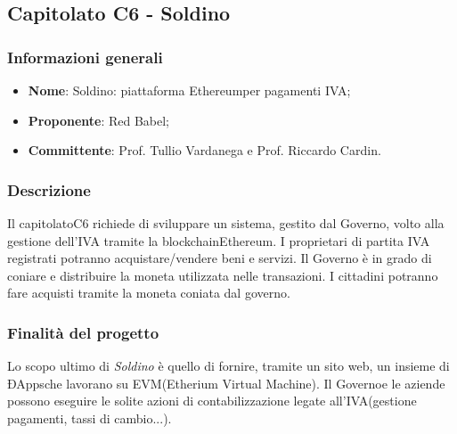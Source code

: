 \subsection{Capitolato C6 - Soldino}

\subsubsection{Informazioni generali}
\begin{itemize}
	\item \textbf {Nome}: Soldino: piattaforma Ethereum\glosp per pagamenti IVA;
	\item \textbf {Proponente}: Red Babel;
	\item \textbf {Committente}: Prof. Tullio Vardanega e Prof. Riccardo Cardin.
\end{itemize}

\subsubsection{Descrizione}
Il capitolato\glosp C6 richiede di sviluppare un sistema, gestito dal Governo\glo, volto alla gestione dell'IVA tramite la blockchain\glosp Ethereum\glo. I proprietari di partita IVA registrati potranno acquistare/vendere beni e servizi.
Il Governo è in grado di coniare e distribuire la moneta utilizzata nelle transazioni. I cittadini potranno fare acquisti tramite la moneta coniata dal governo.   

\subsubsection{Finalità del progetto}
Lo scopo ultimo di \textit{Soldino} è quello di fornire, tramite un sito web, un insieme di ÐApps\glosp che lavorano su EVM\glosp (Etherium Virtual Machine). Il Governo\glosp e le aziende possono eseguire le solite azioni di contabilizzazione legate all'IVA\glosp (gestione pagamenti, tassi di cambio...).  
